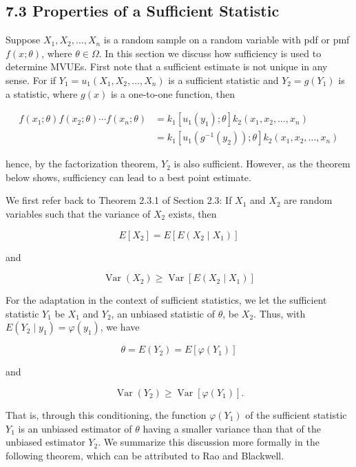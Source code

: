 \subsection*{7.3 Properties of a Sufficient Statistic}
Suppose $X_{1}, X_{2}, \ldots, X_{n}$ is a random sample on a random variable with pdf or pmf $f(x ; \theta)$, where $\theta \in \Omega$. In this section we discuss how sufficiency is used to determine MVUEs. First note that a sufficient estimate is not unique in any sense. For if $Y_{1}=u_{1}\left(X_{1}, X_{2}, \ldots, X_{n}\right)$ is a sufficient statistic and $Y_{2}=g\left(Y_{1}\right)$ is a statistic, where $g(x)$ is a one-to-one function, then

$$
\begin{aligned}
f\left(x_{1} ; \theta\right) f\left(x_{2} ; \theta\right) \cdots f\left(x_{n} ; \theta\right) & =k_{1}\left[u_{1}\left(y_{1}\right) ; \theta\right] k_{2}\left(x_{1}, x_{2}, \ldots, x_{n}\right) \\
& =k_{1}\left[u_{1}\left(g^{-1}\left(y_{2}\right)\right) ; \theta\right] k_{2}\left(x_{1}, x_{2}, \ldots, x_{n}\right)
\end{aligned}
$$

hence, by the factorization theorem, $Y_{2}$ is also sufficient. However, as the theorem below shows, sufficiency can lead to a best point estimate.

We first refer back to Theorem 2.3.1 of Section 2.3: If $X_{1}$ and $X_{2}$ are random variables such that the variance of $X_{2}$ exists, then

$$
E\left[X_{2}\right]=E\left[E\left(X_{2} \mid X_{1}\right)\right]
$$

and

$$
\operatorname{Var}\left(X_{2}\right) \geq \operatorname{Var}\left[E\left(X_{2} \mid X_{1}\right)\right]
$$

For the adaptation in the context of sufficient statistics, we let the sufficient statistic $Y_{1}$ be $X_{1}$ and $Y_{2}$, an unbiased statistic of $\theta$, be $X_{2}$. Thus, with $E\left(Y_{2} \mid y_{1}\right)=\varphi\left(y_{1}\right)$, we have

$$
\theta=E\left(Y_{2}\right)=E\left[\varphi\left(Y_{1}\right)\right]
$$

and

$$
\operatorname{Var}\left(Y_{2}\right) \geq \operatorname{Var}\left[\varphi\left(Y_{1}\right)\right] .
$$

That is, through this conditioning, the function $\varphi\left(Y_{1}\right)$ of the sufficient statistic $Y_{1}$ is an unbiased estimator of $\theta$ having a smaller variance than that of the unbiased estimator $Y_{2}$. We summarize this discussion more formally in the following theorem, which can be attributed to Rao and Blackwell.

